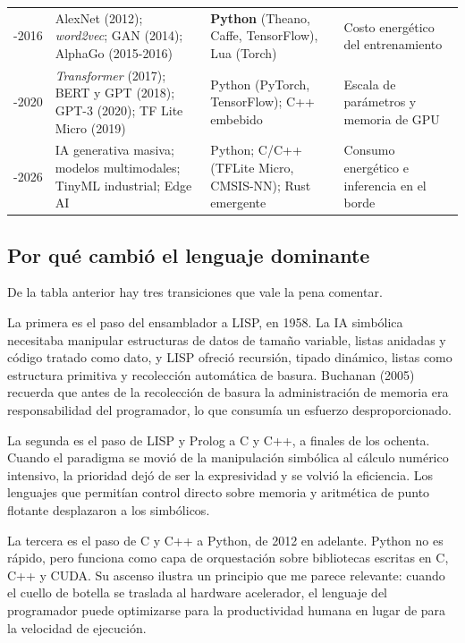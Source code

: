 \documentclass[12pt,letterpaper,oneside]{article}
\begin{document}
\begin{longtable}{@{}L{1.9cm}L{4.5cm}L{3.3cm}L{4.0cm}@{}}
-2016 & AlexNet (2012); \textit{word2vec}; GAN (2014); AlphaGo (2015-2016) & \textbf{Python} (Theano, Caffe, TensorFlow), Lua (Torch) & Costo energético del entrenamiento \\
-2020 & \textit{Transformer} (2017); BERT y GPT (2018); GPT-3 (2020); TF Lite Micro (2019) & Python (PyTorch, TensorFlow); C++ embebido & Escala de parámetros y memoria de GPU \\
-2026 & IA generativa masiva; modelos multimodales; TinyML industrial; Edge AI & Python; C/C++ (TFLite Micro, CMSIS-NN); Rust emergente & Consumo energético e inferencia en el borde \\

\end{longtable}

\subsection{Por qué cambió el lenguaje dominante}

De la tabla anterior hay tres transiciones que vale la pena comentar.

La primera es el paso del ensamblador a LISP, en 1958. La IA simbólica necesitaba manipular estructuras de datos de tamaño variable, listas anidadas y código tratado como dato, y LISP ofreció recursión, tipado dinámico, listas como estructura primitiva y recolección automática de basura. Buchanan (2005) recuerda que antes de la recolección de basura la administración de memoria era responsabilidad del programador, lo que consumía un esfuerzo desproporcionado.

La segunda es el paso de LISP y Prolog a C y C++, a finales de los ochenta. Cuando el paradigma se movió de la manipulación simbólica al cálculo numérico intensivo, la prioridad dejó de ser la expresividad y se volvió la eficiencia. Los lenguajes que permitían control directo sobre memoria y aritmética de punto flotante desplazaron a los simbólicos.

La tercera es el paso de C y C++ a Python, de 2012 en adelante. Python no es rápido, pero funciona como capa de orquestación sobre bibliotecas escritas en C, C++ y CUDA. Su ascenso ilustra un principio que me parece relevante: cuando el cuello de botella se traslada al hardware acelerador, el lenguaje del programador puede optimizarse para la productividad humana en lugar de para la velocidad de ejecución.


\end{document}
